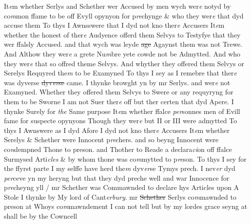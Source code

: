 \documentclass[12pt, a4paper]{book}
\begin{document}
				\marginpar[\vspace{0.5cm}{\textcolor{Gray}{4}}]{}
			 It\textit{e}m whether Serlys and Schether wer Accused by men wych wer\textit{e} notyd by co\textit{m}mon ffame to be off Evyll opynyon for p\textit{re}chynge \& who they wer\textit{e}  that dyd accuse them To thys I Awnsswere that I dyd not kno ther\textit{e} Accusers 
				\marginpar[\vspace{0.5cm}{\textcolor{Gray}{6}}]{}
			 It\textit{e}m whether the honest of ther\textit{e} Audyence offerd them Selvys to Testyfye that they wer ffalsly Accused. and that wych was leyde \sout{age} Agaynst them was not Trewe. And Althow they wer\textit{e} a grete Nu\textit{m}bre yete cowde not be Admytted. And who they wer\textit{e} that so offred theme Selvys. And whyther they offered them Selvys or Serelys Requyred  the\textit{m} to be Examyned To thys I sey as I remebre that ther\textit{e} was dyverse \sout{dyv\textit{er}se }came. I thynke browght yn by mr Serlys. and wer\textit{e} not Examyned. Whether they offered them Selvys to Swere or any requyryng for them to be Sworne I am not Suer ther\textit{e} off but ther certen that dyd
			 Apere. I thynke Surely for \textit{the} Same purpose 
				\marginpar[\vspace{0.5cm}{\textcolor{Gray}{7}}]{}
			 It\textit{e}m whether ffalce \textit{per}sonnes men of Evill fame for suspecte opynyons Though they wer\textit{e} but II or III were admytted To thys I Awnswere as I dyd Afore I dyd not kno ther\textit{e} Accusers 
				\marginpar[\vspace{0.5cm}{\textcolor{Gray}{8}}]{}
			 It\textit{e}m whether Serelys \& Schether 
			were Innocent p\textit{re}chers. and so beyng Innocent were co\textit{n}dempned Thone to preson. and Thother to Reade a declara\textit{ci}on  off ffalce Surmysed Arti\textit{cles} \& by whom thone was co\textit{m}mytted to p\textit{re}son.  To thys I sey for the ffyrst parte I my selffe have herd the\textit{m} dyv\textit{er}se Tymys prech. I nev\textit{er} dyd \textit{per}ceve yn my heryng but that they dyd preche well and war Innocence for p\textit{re}cheyng yll / mr Schether was Commawnded to  declare hys Articles upon A Stole I thynke by My lord of Cant\textit{erbury}. mr \sout{Schether }
               Serlys 
			co\textit{m}mawnded to preson at Whoys co\textit{m}mawndement I can not tell but by my lordes grace seyng at shall be by the Cowncell
\end{document}
